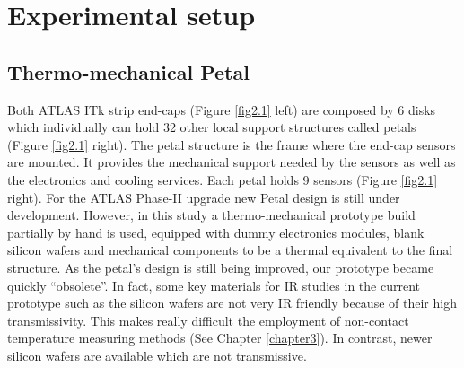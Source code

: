 \pagestyle{standard}

\chapter{Experimental setup}\label{chapter2}

	\thispagestyle{chapter-first-page}
	
	\section{Thermo-mechanical Petal}\label{section2.1}
	
		Both ATLAS ITk strip end-caps (Figure \ref{fig2.1} left) are composed by 6 disks which individually can hold 32 other local support structures called petals (Figure \ref{fig2.1} right). The petal structure is the frame where the end-cap sensors are mounted. It provides the mechanical support needed by the sensors as well as the electronics and cooling services. Each petal holds 9 sensors (Figure \ref{fig2.1} right). For the ATLAS Phase-II upgrade new Petal design is still under development. However, in this study a thermo-mechanical prototype build partially by hand is used, equipped with dummy electronics modules, blank silicon wafers and mechanical components to be a thermal equivalent to the final structure. As the petal’s design is still being improved, our prototype became quickly “obsolete”. In fact, some key materials for IR studies in the current prototype such as the silicon wafers are not very IR friendly because of their high transmissivity. This makes really difficult the employment of non-contact temperature measuring methods (See Chapter \ref{chapter3}). In contrast, newer silicon wafers are available which are not transmissive.
				
